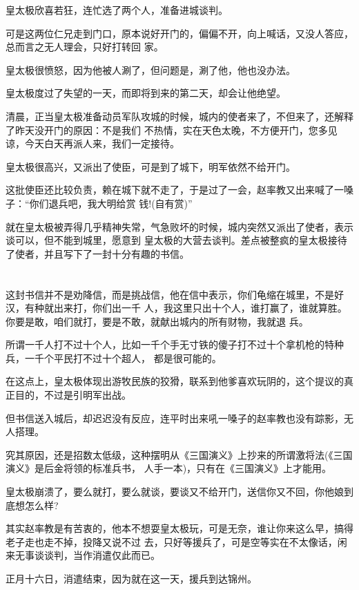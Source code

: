 \documentclass[11pt,a4paper,onecolumn]{article}
\begin{document}
皇太极欣喜若狂，连忙选了两个人，准备进城谈判。

可是这两位仁兄走到门口，原本说好开门的，偏偏不开，向上喊话，又没人答应，总而言之无人理会，只好打转回
家。

皇太极很愤怒，因为他被人涮了，但问题是，涮了他，他也没办法。

皇太极度过了失望的一天，而即将到来的第二天，却会让他绝望。

清晨，正当皇太极准备动员军队攻城的时候，城内的使者来了，不但来了，还解释了昨天没开门的原因：不是我们
不热情，实在天色太晚，不方便开门，您多见谅，今天白天再派人来，我们一定接待。

皇太极很高兴，又派出了使臣，可是到了城下，明军依然不给开门。

这批使臣还比较负责，赖在城下就不走了，于是过了一会，赵率教又出来喊了一嗓子：``你们退兵吧，我大明给赏
钱!(自有赏)''

就在皇太极被弄得几乎精神失常，气急败坏的时候，城内突然又派出了使者，表示谈可以，但不能到城里，愿意到
皇太极的大营去谈判。差点被整疯的皇太极接待了使者，并且写下了一封十分有趣的书信。

\section[\thesection]{}

这封书信并不是劝降信，而是挑战信，他在信中表示，你们龟缩在城里，不是好汉，有种就出来打，你们出一千
人，我这里只出十个人，谁打赢了，谁就算胜。你要是敢，咱们就打，要是不敢，就献出城内的所有财物，我就退
兵。

所谓一千人打不过十个人，比如一千个手无寸铁的傻子打不过十个拿机枪的特种兵，一千个平民打不过十个超人，
都是很可能的。

在这点上，皇太极体现出游牧民族的狡猾，联系到他爹喜欢玩阴的，这个提议的真正目的，不过是引明军出战。

但书信送入城后，却迟迟没有反应，连平时出来吼一嗓子的赵率教也没有踪影，无人搭理。

究其原因，还是招数太低级，这种摆明从《三国演义》上抄来的所谓激将法(《三国演义》是后金将领的标准兵书，
人手一本)，只有在《三国演义》上才能用。

皇太极崩溃了，要么就打，要么就谈，要谈又不给开门，送信你又不回，你他娘到底想怎么样?

其实赵率教是有苦衷的，他本不想耍皇太极玩，可是无奈，谁让你来这么早，搞得老子走也走不掉，投降又说不过
去，只好等援兵了，可是空等实在不太像话，闲来无事谈谈判，当作消遣仅此而已。

正月十六日，消遣结束，因为就在这一天，援兵到达锦州。
\end{document}
